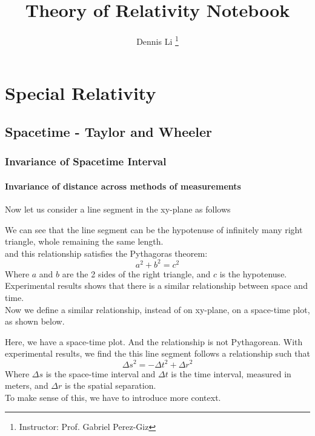 \documentclass[12pt]{book}
\title{\textbf{Theory of Relativity Notebook}}
\author{Dennis Li \thanks{Instructor: Prof. Gabriel Perez-Giz}}
\begin{document}
\maketitle
\tableofcontents

\part{Special Relativity}
\chapter{Spacetime - Taylor and Wheeler}
\section{Invariance of Spacetime Interval}

\subsection{Invariance of distance across methods of measurements}

Now let us consider a line segment in the xy-plane as follows
\begin{center}
\end{center}
We can see that the line segment can be the hypotenuse of infinitely many right triangle, whole remaining the same length.\\
and this relationship satisfies the Pythagoras theorem:
\[
a^2+b^2=c^2
\]
Where $a$ and $b$ are the 2 sides of the right triangle, and $c$ is the hypotenuse.\\
Experimental results shows that there is a similar relationship between space and time.\\
Now we define a similar relationship, instead of on xy-plane, on a space-time plot, as shown below. 
\begin{center}
\end{center}
Here, we have a space-time plot. And the relationship is not Pythagorean. With experimental results, we find the this line segment follows a relationship such that
\[
\Delta s^2=-\Delta t^2 + \Delta r^2
\]
Where $\Delta s$ is the space-time interval and $\Delta t$ is the time interval, measured in meters, and $\Delta r$ is the spatial separation.\\
To make sense of this, we have to introduce more context.
\end{document}
